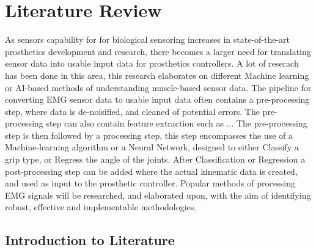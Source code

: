 \documentclass[../main.tex]{subfiles}
\begin{document}
\section{Literature Review}

As sensors capability for for biological sensoring increases in state-of-the-art prosthetics development and research, there becomes a larger need for translating sensor data into usable input data for prosthetics controllers.
A lot of reserach has been done in this area, this research elaborates on different Machine learning or AI-based methods of understanding muscle-based sensor data.
The pipeline for converting EMG sensor data to usable input data often contains a pre-processing step, where data is de-noisified, and cleaned of potential errors.
The pre-processing step can also contain feature extraction such as ...
The pre-processing step is then followed by a processing step, this step encompasses the use of a Machine-learning algorithm or a Neural Network, designed to either Classify a grip type, or Regress the angle of the joints.
After Classification or Regression a post-processing step can be added where the actual kinematic data is created, and used as input to the prosthetic controller. 
Popular methods of processing EMG signals will be researched, and elaborated upon, with the aim of identifying robust, effective and implementable methodologies.


\subsection{Introduction to Literature}
\end{document}
